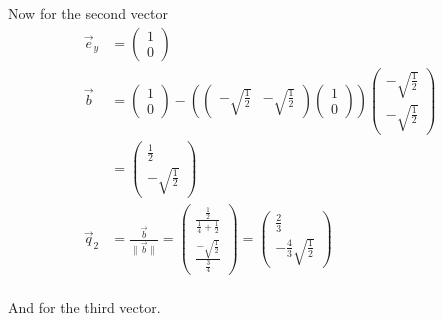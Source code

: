 \documentclass[a4paper]{article}
\begin{document}
\begin{Example}
\begin{PropositionOpt4}
Now for the second vector\\

\begin{displaymath}
\begin{align}
\vec{e}_{y} &= \begin{pmatrix}1\\0\end{pmatrix}\\
	\vec{b} &= \begin{pmatrix}1\\0\end{pmatrix} - 
	(\begin{pmatrix}-\sqrt{\frac12}&-\sqrt{\frac12}\end{pmatrix}
	\begin{pmatrix}1\\0\end{pmatrix})
	\begin{pmatrix}-\sqrt{\frac12}\\-\sqrt{\frac12} \end{pmatrix}\\
	&= \begin{pmatrix}\frac12\\-\sqrt{\frac12}\end{pmatrix}\\
	\vec{q}_{2} &= \frac{\vec{b}}{\|\vec{b}\|}
			= \begin{pmatrix}\frac{\frac12}{\frac14 + \frac12}\\\frac{-\sqrt{\frac12}}{\frac34}\end{pmatrix} 
			= \begin{pmatrix}\frac23\\-\frac43 \sqrt{\frac12}\end{pmatrix}\\    
\end{align}
\end{displaymath}

And for the third vector.\\


\end{PropositionOpt4}
\end{Example}
\end{document}
